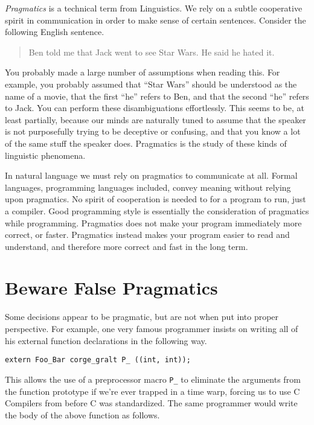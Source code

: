 \documentclass{lulu}
\newcommand{\code}[1]{\texttt{#1}\xspace}
\begin{document}
\textit{Pragmatics} is a technical term from Linguistics.  We rely on
a subtle cooperative spirit in communication in order to make sense of
certain sentences.  Consider the following English sentence.

\begin{quote}
Ben told me that Jack went to see Star Wars.  He said he hated it.
\end{quote}

You probably made a large number of assumptions when reading this.
For example, you probably assumed that ``Star Wars'' should be
understood as the name of a movie, that the first ``he'' refers to
Ben, and that the second ``he'' refers to Jack.  You can perform these
disambiguations effortlessly.  This seems to be, at least partially,
because our minds are naturally tuned to assume that the speaker is
not purposefully trying to be deceptive or confusing, and that you
know a lot of the same stuff the speaker does.  Pragmatics is the
study of these kinds of linguistic phenomena.

In natural language we must rely on pragmatics to communicate at all.
Formal languages, programming languages included, convey meaning
without relying upon pragmatics.  No spirit of cooperation is needed
to for a program to run, just a compiler.  Good programming style is
essentially the consideration of pragmatics while programming.
Pragmatics does not make your program immediately more correct, or
faster.  Pragmatics instead makes your program easier to read and
understand, and therefore more correct and fast in the long term.

\section{Beware False Pragmatics}

Some decisions appear to be pragmatic, but are not when put into
proper perspective.  For example, one very famous programmer insists
on writing all of his external function declarations in the following
way.

\begin{samepage}
\begin{verbatim}
extern Foo_Bar corge_gralt P_ ((int, int));
\end{verbatim}
\end{samepage}

This allows the use of a preprocessor macro \code{P\_} to eliminate
the arguments from the function prototype if we're ever trapped in a
time warp, forcing us to use C Compilers from before C was
standardized.  The same programmer would write the body of the above
function as follows.
\end{document}
